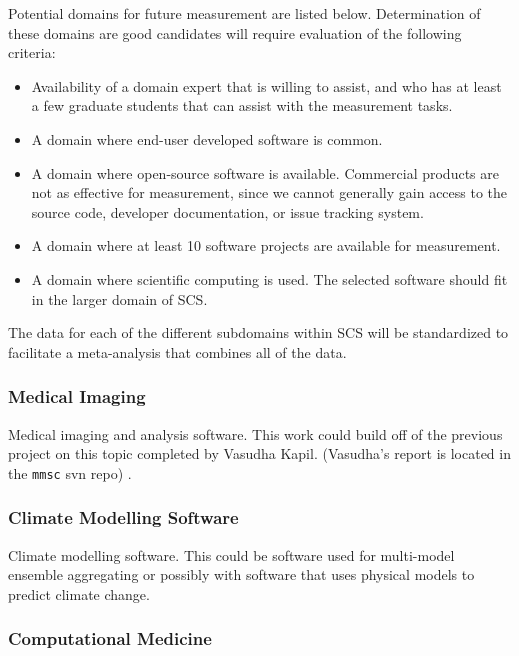 \documentclass[12pt]{article}
\begin{document}
Potential domains for future measurement are listed below.  Determination of
these domains are good candidates will require evaluation of the following
criteria:

\begin{itemize}
\item Availability of a domain expert that is willing to assist, and who has at
  least a few graduate students that can assist with the measurement tasks.
\item A domain where end-user developed software is common.
\item A domain where open-source software is available.  Commercial products are
  not as effective for measurement, since we cannot generally gain access to the
  source code, developer documentation, or issue tracking system.
\item A domain where at least 10 software projects are available for
  measurement.
\item A domain where scientific computing is used.  The selected software should
  fit in the larger domain of SCS.
\end{itemize}

The data for each of the different subdomains within SCS will be standardized to
facilitate a meta-analysis that combines all of the data.

\subsubsection{Medical Imaging}

Medical imaging and analysis software.  This work could build off of the
previous project on this topic completed by Vasudha Kapil.  (Vasudha's report is
located in the \texttt{mmsc} svn repo) .  %

\subsubsection{Climate Modelling Software}

Climate modelling software.  This could be software used for multi-model
ensemble aggregating \citep{SamoulyEtAl2018} or possibly with software that uses
physical models to predict climate change.

\subsubsection{Computational Medicine}
\end{document}
